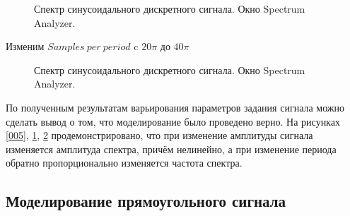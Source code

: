 \documentclass[a4paper,14pt]{extarticle}
\begin{document}
\begin{figure}[H]
\caption{Спектр синусоидального дискретного сигнала. Окно 
Spectrum Analyzer.}
\label{006}
\end{figure}

Изменим $Samples \ per \ period$ c $20\pi$ до $40\pi$

\begin{figure}[H]
\caption{Спектр синусоидального дискретного сигнала. Окно 
Spectrum Analyzer.}
\label{007}
\end{figure}

По полученным результатам варьирования параметров задания сигнала 
можно сделать вывод о том, что моделирование было проведено 
верно. На рисунках \ref{005}, \ref{006}, \ref{007} 
продемонстрировано, что при изменение амплитуды сигнала 
изменяется амплитуда спектра, причём нелинейно, а при изменение 
периода обратно пропорционально изменяется частота спектра.

\subsection{Моделирование прямоугольного сигнала}
\end{document}
